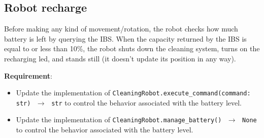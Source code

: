 \subsection{Robot recharge}
Before making any kind of movement/rotation, the robot checks how much battery is left by querying the IBS. When the capacity returned by the IBS is equal to or less than 10\%, the robot shuts down the cleaning system, turns on the recharging led, and stands still (\ie it doesn't update its position in any way).

\noindent\textbf{Requirement}:
\begin{itemize}
    \item Update the implementation of \texttt{CleaningRobot.execute\_command(command: str)  $\,\to\,$ str} to control the behavior associated with the battery level.
    \item Update the implementation of  \texttt{CleaningRobot.manage\_battery()  $\,\to\,$ None} to control the behavior associated with the battery level.
\end{itemize}